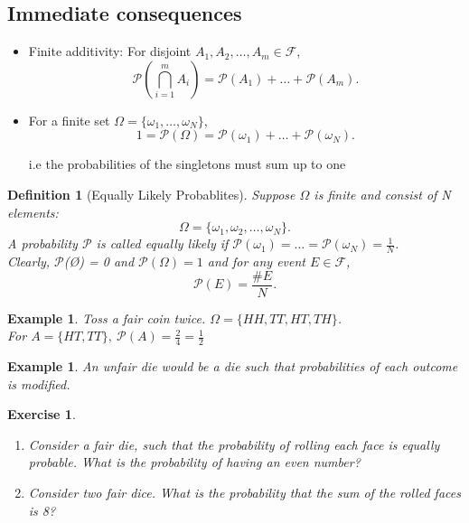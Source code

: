 \documentclass[a4paper]{article}
\newcounter{counter}
\numberwithin{counter}{subsection}
\theoremstyle{break}
\newtheorem{definition}{Definition}
\newtheorem{exmp}[counter]{Example}
\newtheorem{exe}[counter]{Exercise}
\begin{document}
\subsection{Immediate consequences}%
\label{sub:immediate_consequences}

\begin{itemize}
	\item Finite additivity: For disjoint $A_1,A_2,\ldots,A_m \in \mathcal{F}$, \[
			\mathcal{P}(\bigcap_{i=1}^{m} A_i) = \mathcal{P}(A_1) + \ldots + \mathcal{P}(A_m)
	.\] 

\item For a finite set $\Omega = \{\omega_1,\ldots, \omega_N\}$, \[
		1 = \mathcal{P}(\Omega) = \mathcal{P}({\omega_1}) + \ldots + \mathcal{P}({\omega_N})
.\] 

i.e the probabilities of the singletons must sum up to one
\end{itemize}

\begin{definition}[Equally Likely Probablites]
	Suppose $\Omega$ is finite and consist of N elements: \[
	\Omega = \{\omega_1, \omega_2, \ldots, \omega_N\} 
	.\] 
	A probability $\mathcal{P}$ is called equally likely if $\mathcal{P}(\omega_1) = \ldots = \mathcal{P}(\omega_N) = \frac{1}{N}$.\\
	Clearly, $\mathcal{P}$(\O) = 0 and $\mathcal{P}(\Omega) = 1 $ and for any event $E \in \mathcal{F}$, \[
		\mathcal{P}(E) = \frac{\#E}{N}
	.\] 
\end{definition}

\begin{exmp}
	Toss a fair coin twice. $\Omega = \{H H, T T, H T, T H\} $.\\
	For $A = \{H T, T T\}, \: \mathcal{P}(A) = \frac{2}{4} = \frac{1}{2}$
\end{exmp}

\begin{exmp}
	An unfair die would be a die such that probabilities of each outcome is modified.  
\end{exmp}

\begin{exe}
	\begin{enumerate}
		\item Consider a fair die, such that the probability of rolling each face is equally probable. What is the probability of having an even number?
		\item Consider two fair dice. What is the probability that the sum of the rolled faces is 8?
	\end{enumerate}
\end{exe}
\end{document}
